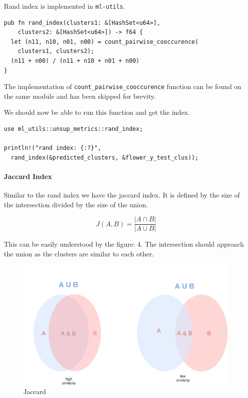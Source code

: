 \documentclass{book}
\begin{document}
Rand index is implemented in \lstinline{ml-utils}.

\begin{lstlisting}[caption={ml\\-utils\\/src\\/unsup\_metrics\\.rs},basicstyle=\small]
pub fn rand_index(clusters1: &[HashSet<u64>],
    clusters2: &[HashSet<u64>]) -> f64 {
  let (n11, n10, n01, n00) = count_pairwise_cooccurence(
    clusters1, clusters2);
  (n11 + n00) / (n11 + n10 + n01 + n00)
}
\end{lstlisting}

The implementation of \lstinline{count_pairwise_cooccurence} function can be found on the same module and has been skipped for brevity.

We should now be able to run this function and get the index.

\begin{lstlisting}[caption={ml\\-utils\\/src\\/unsup\_metrics\\.rs},basicstyle=\small]
use ml_utils::unsup_metrics::rand_index;

println!("rand index: {:?}",
  rand_index(&predicted_clusters, &flower_y_test_clus));
\end{lstlisting}

\label{par:rand_index}

\paragraph{Jaccard Index}%
Similar to the rand index we have the jaccard index. It is defined by the size of the intersection divided by the size of the union.

\begin{equation}
	J(A, B) = \frac{|A \cap B|}{|A \cup B|}
\end{equation}

This can be easily understood by the figure: 4. The intersection should approach the union as the clusters are similar to each other.

\begin{figure}[]
	\centering
	\includegraphics[width=0.8\linewidth]{jaccard.png}
	\caption{Jaccard}
	\label{fig:jaccard}
\end{figure}
\end{document}

